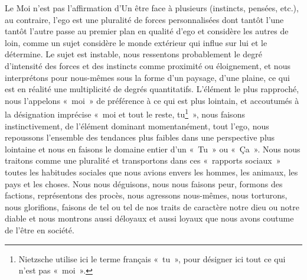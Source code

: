 
{Le Moi n'est pas l'affirmation d'Un être face à plusieurs (instincts,
pensées, etc.), au contraire, l'ego est une pluralité de forces
personnalisées dont tantôt l'une tantôt l'autre passe au premier plan
en qualité d'ego et considère les autres de loin, comme un sujet
considère le monde extérieur qui influe sur lui et le détermine. Le
sujet est instable, nous ressentons probablement le degré d'intensité
des forces et des instincts comme proximité ou éloignement, et nous
interprétons pour nous-mêmes sous la forme d'un paysage, d'une
plaine, ce qui est en réalité une multiplicité de degrés
quantitatifs. L'élément le plus rapproché, nous l'appelons «~moi~» de
préférence à ce qui est plus lointain, et accoutumés à la désignation
imprécise «~moi et tout le reste, tu\footnote{Nietzsche utilise ici
le terme français «~tu~», pour désigner ici tout ce qui n'est pas
«~moi~».}~», nous faisons instinctivement, de l'élément dominant
momentanément, tout l'ego, nous repoussons l'ensemble des tendances
plus faibles dans une perspective plus lointaine et nous en faisons
le domaine entier d'un «~Tu~» ou «~Ça~». Nous nous traitons comme une
pluralité et transportons dans ces «~rapports sociaux~» toutes les
habitudes sociales que nous avions envers les hommes, les animaux,
les pays et les choses. Nous nous déguisons, nous nous faisons peur,
formons des factions, représentons des procès, nous agressons nous-mêmes, nous torturons, nous glorifions, faisons de tel ou tel de nos
traits de caractère notre dieu ou notre diable et nous montrons aussi
déloyaux et aussi loyaux que nous avons coutume de l'être en société.
}

